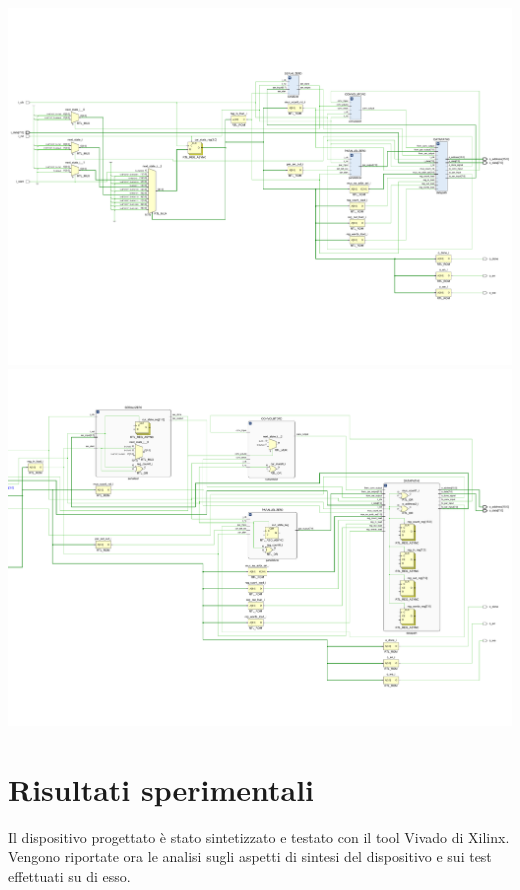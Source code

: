 \documentclass[a4paper]{report}
\begin{document}
\includegraphics[scale = 0.45]{schematics/schematic.pdf}
\\
\includegraphics[scale = 0.45]{schematics/schematicComplete.pdf}


\chapter{Risultati sperimentali}
Il dispositivo progettato è stato sintetizzato e testato con il tool Vivado di Xilinx. Vengono riportate ora le analisi sugli aspetti di sintesi del dispositivo e sui test effettuati su di esso.
\end{document}
